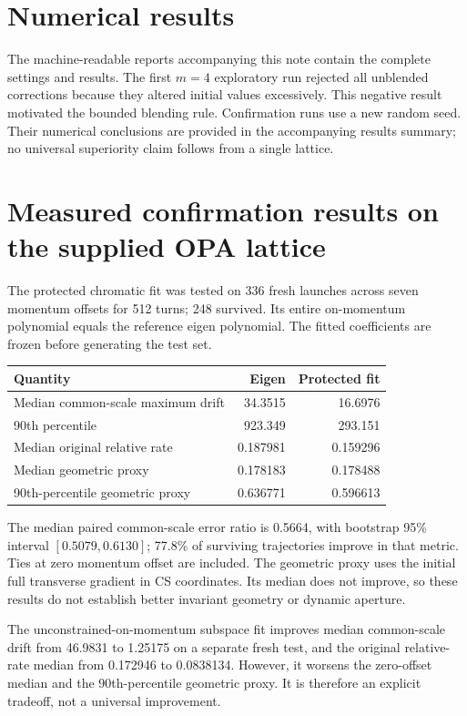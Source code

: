 \documentclass[11pt]{article}
\begin{document}
\section{Numerical results}
The machine-readable reports accompanying this note contain the complete settings and results. The first $m=4$ exploratory run rejected all unblended corrections because they altered initial values excessively. This negative result motivated the bounded blending rule. Confirmation runs use a new random seed. Their numerical conclusions are provided in the accompanying results summary; no universal superiority claim follows from a single lattice.

\section{Measured confirmation results on the supplied OPA lattice}
The protected chromatic fit was tested on 336 fresh launches across seven momentum offsets for 512 turns; 248 survived. Its entire on-momentum polynomial equals the reference eigen polynomial. The fitted coefficients are frozen before generating the test set.
\begin{center}\begin{tabular}{lrr}\toprule
Quantity & Eigen & Protected fit\\\midrule
Median common-scale maximum drift & 34.3515 & 16.6976\\
90th percentile & 923.349 & 293.151\\
Median original relative rate & 0.187981 & 0.159296\\
Median geometric proxy & 0.178183 & 0.178488\\
90th-percentile geometric proxy & 0.636771 & 0.596613\\\bottomrule
\end{tabular}\end{center}
The median paired common-scale error ratio is 0.5664, with bootstrap 95\% interval $[0.5079,0.6130]$; 77.8\% of surviving trajectories improve in that metric. Ties at zero momentum offset are included. The geometric proxy uses the initial full transverse gradient in CS coordinates. Its median does not improve, so these results do not establish better invariant geometry or dynamic aperture.

The unconstrained-on-momentum subspace fit improves median common-scale drift from 46.9831 to 1.25175 on a separate fresh test, and the original relative-rate median from 0.172946 to 0.0838134. However, it worsens the zero-offset median and the 90th-percentile geometric proxy. It is therefore an explicit tradeoff, not a universal improvement.
\end{document}
